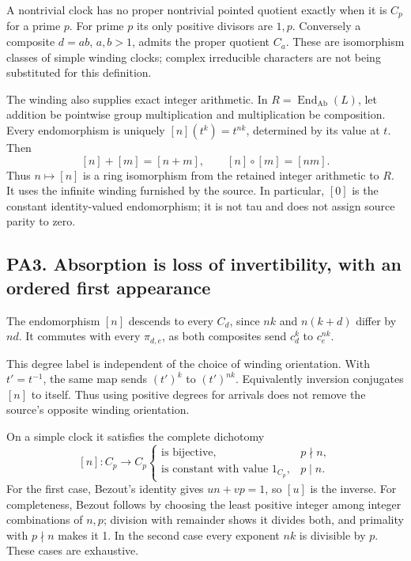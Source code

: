 A nontrivial clock has no proper nontrivial pointed quotient exactly when it is \(C_p\) for a prime \(p\). For prime \(p\) its only positive divisors are \(1,p\). Conversely a composite \(d=ab\), \(a,b>1\), admits the proper quotient \(C_a\). These are isomorphism classes of simple winding clocks; complex irreducible characters are not being substituted for this definition.

The winding also supplies exact integer arithmetic. In \(R=\operatorname{End}_{\mathrm{Ab}}(L)\), let addition be pointwise group multiplication and multiplication be composition. Every endomorphism is uniquely \([n](t^k)=t^{nk}\), determined by its value at \(t\). Then \[
[n]+[m]=[n+m],\qquad[n]\circ[m]=[nm].
\] Thus \(n\mapsto[n]\) is a ring isomorphism from the retained integer arithmetic to \(R\). It uses the infinite winding furnished by the source. In particular, \([0]\) is the constant identity-valued endomorphism; it is not tau and does not assign source parity to zero.

\subsection{PA3. Absorption is loss of invertibility, with an ordered first appearance}\label{pa20260924-pa3.-absorption-is-loss-of-invertibility-with-an-ordered-first-appearance}

The endomorphism \([n]\) descends to every \(C_d\), since \(nk\) and \(n(k+d)\) differ by \(nd\). It commutes with every \(\pi_{d,e}\), as both composites send \(c_d^k\) to \(c_e^{nk}\).

This degree label is independent of the choice of winding orientation. With \(t'=t^{-1}\), the same map sends \((t')^k\) to \((t')^{nk}\). Equivalently inversion conjugates \([n]\) to itself. Thus using positive degrees for arrivals does not remove the source's opposite winding orientation.

On a simple clock it satisfies the complete dichotomy \[
[n]:C_p\longrightarrow C_p
\begin{cases}
\text{is bijective},&p\nmid n,\\
\text{is constant with value }1_{C_p},&p\mid n.
\end{cases}
\tag{PA3.1}
\] For the first case, Bezout's identity gives \(u n+v p=1\), so \([u]\) is the inverse. For completeness, Bezout follows by choosing the least positive integer among integer combinations of \(n,p\); division with remainder shows it divides both, and primality with \(p\nmid n\) makes it 1. In the second case every exponent \(nk\) is divisible by \(p\). These cases are exhaustive.

